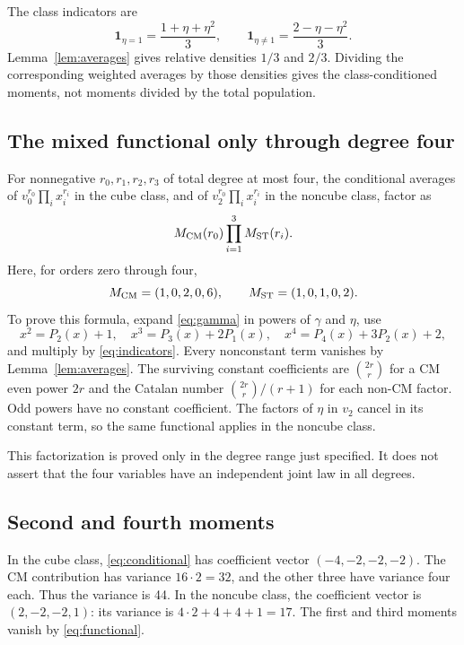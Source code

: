 \documentclass[11pt]{article}
\theoremstyle{definition}\newtheorem{definition}[theorem]{Definition}
\newcommand{\ind}{\mathbf1}
\begin{document}
The class indicators are
\begin{equation}\label{eq:indicators}
 \ind_{\eta=1}=\frac{1+\eta+\eta^2}{3},\qquad
 \ind_{\eta\ne1}=\frac{2-\eta-\eta^2}{3}.
\end{equation}
Lemma~\ref{lem:averages} gives relative densities
$1/3$ and $2/3$. Dividing the corresponding
weighted averages by those densities gives the
class-conditioned moments, not moments divided
by the total population.

\subsection{The mixed functional only through degree four}
For nonnegative $r_0,r_1,r_2,r_3$ of total degree
at most four, the conditional averages of
$v_0^{r_0}\prod_i x_i^{r_i}$ in the cube class,
and of $v_2^{r_0}\prod_i x_i^{r_i}$ in the
noncube class, factor as
\begin{equation}\label{eq:functional}
 M_{\rm CM}(r_0)\prod_{i=1}^3M_{\rm ST}(r_i).
\end{equation}
Here, for orders zero through four,
\[
 M_{\rm CM}=(1,0,2,0,6),\qquad
 M_{\rm ST}=(1,0,1,0,2).
\]
To prove this formula, expand \eqref{eq:gamma} in
powers of $\gamma$ and $\eta$, use
\[
 x^2=P_2(x)+1,\quad
 x^3=P_3(x)+2P_1(x),\quad
 x^4=P_4(x)+3P_2(x)+2,
\]
and multiply by \eqref{eq:indicators}.
Every nonconstant term vanishes by
Lemma~\ref{lem:averages}. The surviving constant
coefficients are $\binom{2r}{r}$ for a CM even
power $2r$ and the Catalan number
$\binom{2r}{r}/(r+1)$ for each non-CM factor.
Odd powers have no constant coefficient.
The factors of $\eta$ in $v_2$ cancel in its
constant term, so the same functional applies
in the noncube class.

This factorization is proved only in the degree
range just specified. It does not assert that
the four variables have an independent joint
law in all degrees.

\subsection{Second and fourth moments}
In the cube class, \eqref{eq:conditional} has
coefficient vector $(-4,-2,-2,-2)$.
The CM contribution has variance $16\cdot2=32$,
and the other three have variance four each.
Thus the variance is 44. In the noncube class,
the coefficient vector is $(2,-2,-2,1)$:
its variance is $4\cdot2+4+4+1=17$.
The first and third moments vanish by
\eqref{eq:functional}.
\end{document}
